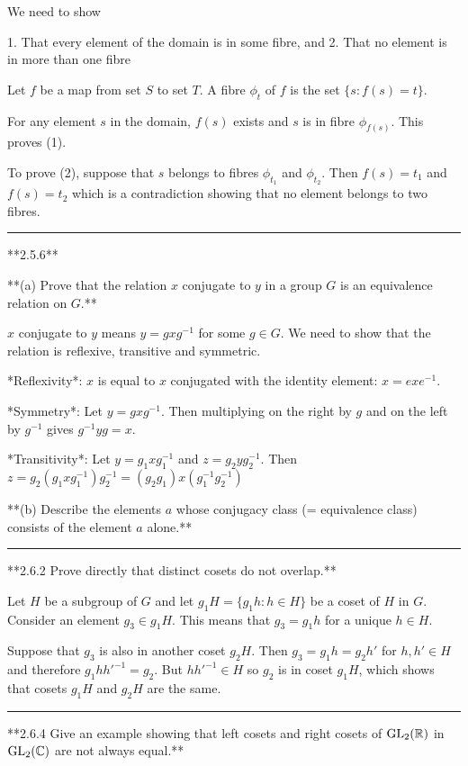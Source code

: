 We need to show

1. That every element of the domain is in some fibre, and
2. That no element is in more than one fibre

Let $f$ be a map from set $S$ to set $T$. A fibre $\phi_t$ of $f$ is the set
$\{s: f(s) = t\}$.

For any element $s$ in the domain, $f(s)$ exists and $s$ is in fibre
$\phi_{f(s)}$. This proves (1).

To prove (2), suppose that $s$ belongs to fibres $\phi_{t_1}$ and
$\phi_{t_2}$. Then $f(s) = t_1$ and $f(s) = t_2$ which is a contradiction
showing that no element belongs to two fibres.

\hrule

**2.5.6**

**(a) Prove that the relation $x$ conjugate to $y$ in a group $G$ is an
  equivalence relation on $G$.**

$x$ conjugate to $y$ means $y = gxg^{-1}$ for some $g \in G$. We need to show
that the relation is reflexive, transitive and symmetric.

*Reflexivity*: $x$ is equal to $x$ conjugated with the identity element: $x = exe^{-1}$.

*Symmetry*: Let $y = gxg^{-1}$. Then multiplying on the right by $g$ and on the
            left by $g^{-1}$ gives $g^{-1}yg = x$.

*Transitivity*: Let $y = g_1xg_1^{-1}$ and $z = g_2yg_2^{-1}$. Then $z =
                g_2(g_1xg_1^{-1})g_2^{-1} = (g_2g_1)x(g_1^{-1}g_2^{-1})$


**(b) Describe the elements $a$ whose conjugacy class (= equivalence class)
consists of the element $a$ alone.**

\hrule

**2.6.2 Prove directly that distinct cosets do not overlap.**

Let $H$ be a subgroup of $G$ and let $g_1H = \{g_1h:h\in H\}$ be a coset of $H$
in $G$. Consider an element $g_3 \in g_1H$. This means that $g_3 = g_1h$ for a
unique $h \in H$.

Suppose that $g_3$ is also in another coset $g_2H$. Then $g_3 = g_1h = g_2h'$
for $h, h' \in H$ and therefore $g_1hh'^{-1} = g_2$. But $hh'^{-1} \in H$ so
$g_2$ is in coset $g_1H$, which shows that cosets $g_1H$ and $g_2H$ are the
same.

\hrule

**2.6.4 Give an example showing that left cosets and right cosets of $\mathrm{GL}_2(\mathbb{R})$
  in $\mathrm{GL}_2(\mathbb{C})$ are not always equal.**

